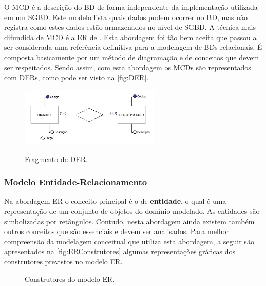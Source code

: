 O \ac{MCD} é a descrição do \ac{BD} de forma independente da implementação utilizada em um \ac{SGBD}. 
Este modelo lista quais dados podem ocorrer no \ac{BD}, mas não registra como estes dados estão armazenados no nível de \ac{SGBD}. 
A técnica mais difundida de \ac{MCD} é a \ac{ER} de . 
Esta abordagem foi tão bem aceita que passou a ser considerada uma referência definitiva para a modelagem de \acp{BD} relacionais. 
É composta basicamente por um método de diagramação e de conceitos que devem ser respeitados. 
Sendo assim, com esta abordagem os \acp{MCD} são representados com \acp{DER}, como pode ser visto na \autoref{fig:DER}.
    
\begin{figure}[htb]
	\centering
	\caption{Fragmento de DER.}
		\includegraphics[width=0.6\textwidth]{img/MCD.jpg}
	\label{fig:DER}
\end{figure}

    \subsubsection{Modelo Entidade-Relacionamento} \label{ssec:ModeloER}

Na abordagem \ac{ER} o conceito principal é o de \textbf{entidade}, o qual é uma representação de um conjunto de objetos do domínio modelado. 
As entidades são simbolizadas por retângulos. 
Contudo, nesta abordagem ainda existem também outros conceitos que são essenciais e devem ser analisados. 
Para melhor compreensão da modelagem conceitual que utiliza esta abordagem, a seguir são apresentados na \autoref{fig:ERConstrutores} algumas representações gráficas dos construtores previstos no modelo \ac{ER}. 

\begin{figure} [!htb]
    \centering
    \caption{Construtores do modelo \ac{ER}.}
    \label{fig:ERConstrutores}
    
\end{figure}

